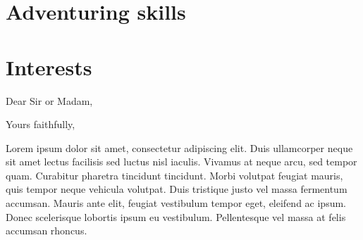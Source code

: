 \documentclass[11pt,a4paper,sans]{moderncv}   %
\begin{document}
\section{Adventuring skills}

\section{Interests}

\nocite{*}



\clearpage
\date{January 01, 2001}
\opening{Dear Sir or Madam,}
\closing{Yours faithfully,}
\makelettertitle

Lorem ipsum dolor sit amet, consectetur adipiscing elit. Duis ullamcorper neque sit amet lectus facilisis sed luctus nisl iaculis. Vivamus at neque arcu, sed tempor quam. Curabitur pharetra tincidunt tincidunt. Morbi volutpat feugiat mauris, quis tempor neque vehicula volutpat. Duis tristique justo vel massa fermentum accumsan. Mauris ante elit, feugiat vestibulum tempor eget, eleifend ac ipsum. Donec scelerisque lobortis ipsum eu vestibulum. Pellentesque vel massa at felis accumsan rhoncus.
\end{document}
